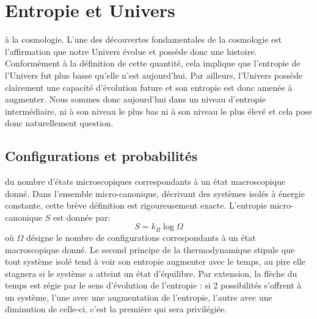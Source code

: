 \chapter{Entropie et Univers}
 à la cosmologie. L'une des découvertes fondamentales de la cosmologie est l'affirmation que notre Univers évolue et possède donc une histoire. Conformément à la définition de cette quantité, cela implique que l'entropie de l'Univers fut plus basse qu'elle n'est aujourd'hui. Par ailleurs, l'Univers possède clairement une capacité d'évolution future et son entropie est donc amenée à augmenter. Nous sommes donc aujourd'hui dans un niveau d'entropie intermédiaire, ni à son niveau le plus bas ni à son niveau le plus élevé et cela pose donc naturellement question.

\section{Configurations et probabilités}
 du nombre d'états microscopiques correspondants à un état macroscopique donné. Dans l'ensemble micro-canonique, décrivant des systèmes isolés à énergie constante, cette brève définition est rigoureusement exacte. L'entropie micro-canonique $S$ est donnée par:
\begin{equation}
S=k_B\log \Omega
\end{equation}
où $\Omega$ désigne le nombre de configurations correspondants à un état macroscopique donné. Le second principe de la thermodynamique stipule que tout système isolé tend à voir son entropie augmenter avec le temps, au pire elle stagnera si le système a atteint un état d'équilibre. Par extension, la flèche du temps est régie par le sens d'évolution de l'entropie : si 2 possibilités s'offrent à un système, l'une avec une augmentation de l'entropie, l'autre avec une diminution de celle-ci, c'est la première qui sera privilégiée.

